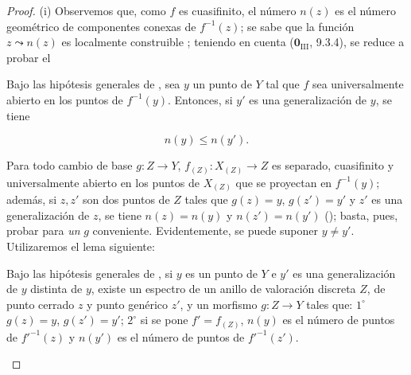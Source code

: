 \begin{proof}
(i)
Observemos que, como $f$ es cuasifinito, el número $n(z)$ es el número geométrico de componentes conexas de $f^{-1}(z)$; se sabe que la función $z\leadsto n(z)$ es localmente construible ; teniendo en cuenta ($\mathbf{0}_{\mathrm{III}}$, 9.3.4), se reduce a probar el

\begin{corollary}[15.5.2]
\label{IV.15.5.2}
Bajo las hipótesis generales de , sea $y$ un punto de $Y$ tal que $f$ sea universalmente abierto en los puntos de $f^{-1}(y)$.
Entonces, si $y'$ es una generalización de $y$, se tiene


\begin{equation}
\tag{15.5.2.1}
\label{IV.15.5.2.1-fr}
  n(y)\leqslant n(y').
\end{equation}\end{corollary}



Para todo cambio de base $g:Z\to Y$, $f_{(Z)}:X_{(Z)}\to Z$ es separado, cuasifinito y universalmente abierto en los puntos de $X_{(Z)}$ que se proyectan en $f^{-1}(y)$; además, si $z,z'$ son dos puntos de $Z$ tales que $g(z)=y$, $g(z')=y'$ y $z'$ es una generalización de $z$, se tiene $n(z)=n(y)$ y $n(z')=n(y')$ (); basta, pues, probar  para \emph{un} $g$ conveniente.
Evidentemente, se puede suponer $y\ne y'$.
Utilizaremos el lema siguiente:

\begin{lemma}[15.5.2.2]
\label{IV.15.5.2.2}
Bajo las hipótesis generales de , si $y$ es un punto de $Y$ e $y'$ es una generalización de $y$ distinta de $y$, existe un espectro de un anillo de valoración discreta $Z$, de punto cerrado $z$ y punto genérico $z'$, y un morfismo $g:Z\to Y$ tales que:
$1^\circ$ $g(z)=y$, $g(z')=y'$;
$2^\circ$ si se pone $f'=f_{(Z)}$, $n(y)$ es el número de puntos de $f'^{-1}(z)$ y $n(y')$ es el número de puntos de $f'^{-1}(z')$.
\end{lemma}



\end{proof}
